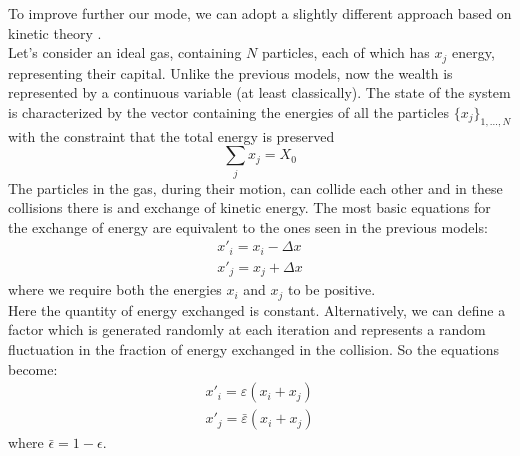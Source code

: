 To improve further our mode, we can adopt a slightly different approach based on kinetic theory \cite{econophysics}. \\
Let's consider an ideal gas, containing $N$ particles, each of which has $x_j$ energy, representing their capital.
Unlike the previous models, now the wealth is represented by a continuous variable (at least classically).
The state of the system is characterized by the vector containing the energies of all the particles $\{x_j\}_{1,\ldots,N}$ with the constraint that the total energy is preserved
\begin{equation*}
	\sum_j x_j = X_0
\end{equation*}
The particles in the gas, during their motion, can collide each other and in these collisions there is and exchange of kinetic energy.
The most basic equations for the exchange of energy are equivalent to the ones seen in the previous models:
\begin{equation*}
	\begin{split}
		x'_i = x_i - \Delta x \\
		x'_j = x_j + \Delta x 
	\end{split}
\end{equation*}
where we require both the energies $x_i$ and $x_j$ to be positive. \\
Here the quantity of energy exchanged is constant.
Alternatively, we can define a factor which is generated randomly at each iteration and represents a random fluctuation in the fraction of energy exchanged in the collision.
So the equations become:
\begin{equation*}
	\begin{split}
		x'_i = \varepsilon(x_i + x_j)	 \\
		x'_j = \bar{\varepsilon}(x_i + x_j)
	\end{split}
\end{equation*}
where $\bar{\epsilon} = 1 - \epsilon$.\\

